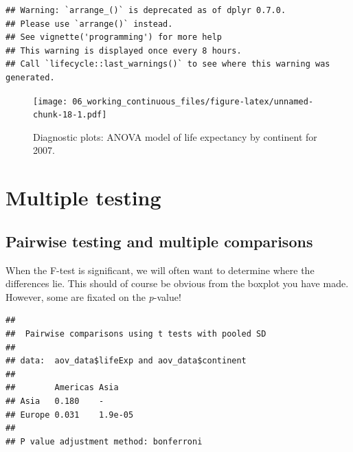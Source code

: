 \documentclass[
  12pt,
  krantz2]{krantz}
\makeatletter
\newenvironment{Shaded}{\begin{snugshade}}{\end{snugshade}}
\newcommand{\DataTypeTok}[1]{\textcolor[rgb]{0.13,0.29,0.53}{#1}}
\newcommand{\KeywordTok}[1]{\textcolor[rgb]{0.13,0.29,0.53}{\textbf{#1}}}
\newcommand{\NormalTok}[1]{#1}
\newcommand{\OperatorTok}[1]{\textcolor[rgb]{0.81,0.36,0.00}{\textbf{#1}}}
\newcommand{\StringTok}[1]{\textcolor[rgb]{0.31,0.60,0.02}{#1}}
\newenvironment{kframe}{%
\medskip{}
\setlength{\fboxsep}{.8em}
 \def\at@end@of@kframe{}%
 \ifinner\ifhmode%
  \def\at@end@of@kframe{\end{minipage}}%
  \begin{minipage}{\columnwidth}%
 \fi\fi%
 \def\FrameCommand##1{\hskip\@totalleftmargin \hskip-\fboxsep
 \colorbox{shadecolor}{##1}\hskip-\fboxsep
     \hskip-\linewidth \hskip-\@totalleftmargin \hskip\columnwidth}%
 \MakeFramed {\advance\hsize-\width
   \@totalleftmargin\z@ \linewidth\hsize
   \@setminipage}}%
 {\par\unskip\endMakeFramed%
 \at@end@of@kframe}
\renewenvironment{Shaded}{\begin{kframe}}{\end{kframe}}
\makeatother
\begin{document}
\begin{verbatim}
## Warning: `arrange_()` is deprecated as of dplyr 0.7.0.
## Please use `arrange()` instead.
## See vignette('programming') for more help
## This warning is displayed once every 8 hours.
## Call `lifecycle::last_warnings()` to see where this warning was generated.
\end{verbatim}

\begin{figure}
\centering
\texttt{[image: 06\_working\_continuous\_files/figure-latex/unnamed-chunk-18-1.pdf]}
\caption{\label{fig:unnamed-chunk-18}Diagnostic plots: ANOVA model of life expectancy by continent for 2007.}
\end{figure}

\FloatBarrier

\hypertarget{multiple-testing}{%
\section{Multiple testing}\label{multiple-testing}}


\hypertarget{pairwise-testing-and-multiple-comparisons}{%
\subsection{Pairwise testing and multiple comparisons}\label{pairwise-testing-and-multiple-comparisons}}


When the F-test is significant, we will often want to determine where the differences lie.
This should of course be obvious from the boxplot you have made.
However, some are fixated on the \emph{p}-value!

\begin{Shaded}
\end{Shaded}

\begin{verbatim}
## 
##  Pairwise comparisons using t tests with pooled SD 
## 
## data:  aov_data$lifeExp and aov_data$continent 
## 
##        Americas Asia   
## Asia   0.180    -      
## Europe 0.031    1.9e-05
## 
## P value adjustment method: bonferroni
\end{verbatim}
\end{document}
